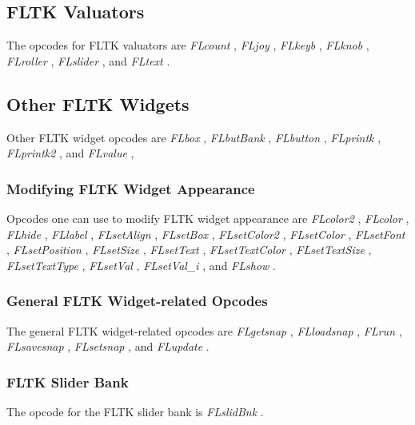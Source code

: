 \subsection*{FLTK Valuators}


  The opcodes for FLTK valuators are \emph{FLcount}
, \emph{FLjoy}
, \emph{FLkeyb}
, \emph{FLknob}
, \emph{FLroller}
, \emph{FLslider}
, and \emph{FLtext}
. 
\subsection*{Other FLTK Widgets}


  Other FLTK widget opcodes are \emph{FLbox}
, \emph{FLbutBank}
, \emph{FLbutton}
, \emph{FLprintk}
, \emph{FLprintk2}
, and \emph{FLvalue}
, 
\subsubsection*{Modifying FLTK Widget Appearance}


  Opcodes one can use to modify FLTK widget appearance are \emph{FLcolor2}
, \emph{FLcolor}
, \emph{FLhide}
, \emph{FLlabel}
, \emph{FLsetAlign}
, \emph{FLsetBox}
, \emph{FLsetColor2}
, \emph{FLsetColor}
, \emph{FLsetFont}
, \emph{FLsetPosition}
, \emph{FLsetSize}
, \emph{FLsetText}
, \emph{FLsetTextColor}
, \emph{FLsetTextSize}
, \emph{FLsetTextType}
, \emph{FLsetVal}
, \emph{FLsetVal\_i}
, and \emph{FLshow}
. 
\subsubsection*{General FLTK Widget-related Opcodes}


  The general FLTK widget-related opcodes are \emph{FLgetsnap}
, \emph{FLloadsnap}
, \emph{FLrun}
, \emph{FLsavesnap}
, \emph{FLsetsnap}
, and \emph{FLupdate}
. 
\subsubsection*{FLTK Slider Bank}


  The opcode for the FLTK slider bank is \emph{FLslidBnk}
. 


\begin{comment}
\begin{tabular}{lcr}
Previous &Home &Next \\
Duration Control Statements &Up &Instrument Invocation

\end{tabular}



\end{comment}
